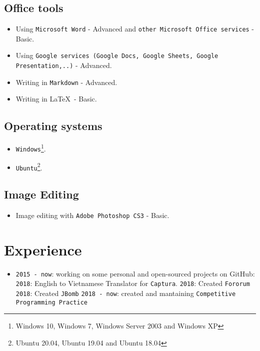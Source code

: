 \documentclass{article}
\begin{document}
        \subsection{Office tools}
        \begin{itemize}
            \item Using \texttt{Microsoft Word} - Advanced and \texttt{other Microsoft Office services} - Basic.
            \item Using \texttt{Google services (Google Docs, Google Sheets, Google Presentation,..)} - Advanced.
            \item Writing in \texttt{Markdown} - Advanced.
            \item Writing in \LaTeX\ - Basic.
        \end{itemize}

        \subsection{Operating systems}
        \begin{itemize}
            \item \texttt{Windows}\footnote{Windows 10, Windows 7, Windows Server 2003 and Windows XP}.
            \item \texttt{Ubuntu}\footnote{Ubuntu 20.04, Ubuntu 19.04 and Ubuntu 18.04}.
        \end{itemize}

        \subsection{Image Editing}
        \begin{itemize}
            \item Image editing with \texttt{Adobe Photoshop CS3} - Basic.
        \end{itemize}

    \section{Experience}
            \begin{itemize}
                \item \texttt{2015 - now}: working on some personal and open-sourced projects on GitHub:
                \subitem \texttt{2018}: English to Vietnamese Translator for \texttt{Captura}\cite{Captura}.
                \subitem \texttt{2018}: Created \texttt{Fororum}\cite{fororum}
                \subitem \texttt{2018}: Created \texttt{JBomb}\cite{jbomb}
                \subitem \texttt{2018 - now}: created and mantaining \texttt{Competitive Programming Practice}\cite{cpp}
            \end{itemize}
\end{document}
